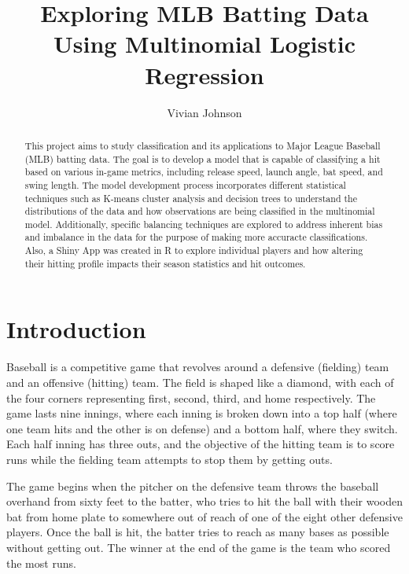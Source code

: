 \documentclass[
  letterpaper,
  DIV=11,
  numbers=noendperiod]{scrartcl}
\title{Exploring MLB Batting Data Using Multinomial Logistic Regression}
\author{Vivian Johnson}
\date{}
\begin{document}
\maketitle
\begin{abstract}
This project aims to study classification and its applications to Major
League Baseball (MLB) batting data. The goal is to develop a model that
is capable of classifying a hit based on various in-game metrics,
including release speed, launch angle, bat speed, and swing length. The
model development process incorporates different statistical techniques
such as K-means cluster analysis and decision trees to understand the
distributions of the data and how observations are being classified in
the multinomial model. Additionally, specific balancing techniques are
explored to address inherent bias and imbalance in the data for the
purpose of making more accuracte classifications. Also, a Shiny App was
created in R to explore individual players and how altering their
hitting profile impacts their season statistics and hit outcomes.
\end{abstract}

\newpage

\setcounter{tocdepth}{4}
\tableofcontents

\newpage

\section{Introduction}\label{introduction}

Baseball is a competitive game that revolves around a defensive
(fielding) team and an offensive (hitting) team. The field is shaped
like a diamond, with each of the four corners representing first,
second, third, and home respectively. The game lasts nine innings, where
each inning is broken down into a top half (where one team hits and the
other is on defense) and a bottom half, where they switch. Each half
inning has three outs, and the objective of the hitting team is to score
runs while the fielding team attempts to stop them by getting outs.

The game begins when the pitcher on the defensive team throws the
baseball overhand from sixty feet to the batter, who tries to hit the
ball with their wooden bat from home plate to somewhere out of reach of
one of the eight other defensive players. Once the ball is hit, the
batter tries to reach as many bases as possible without getting out. The
winner at the end of the game is the team who scored the most runs.
\end{document}
